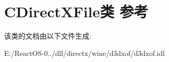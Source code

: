 \hypertarget{class_c_direct_x_file}{}\section{C\+Direct\+X\+File类 参考}
\label{class_c_direct_x_file}


该类的文档由以下文件生成\+:\begin{DoxyCompactItemize}
\item 
E\+:/\+React\+O\+S-\/0../dll/directx/wine/d3dxof/d3dxof.\+idl\end{DoxyCompactItemize}

